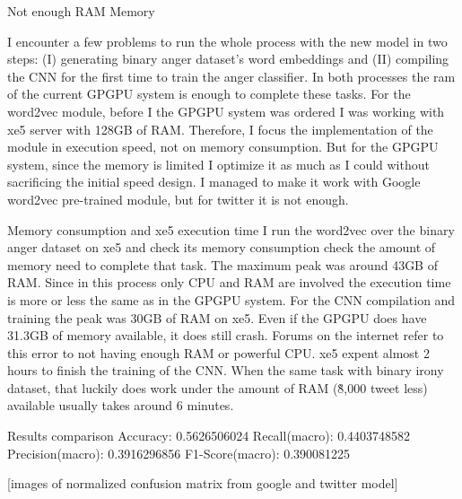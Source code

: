 Not enough RAM Memory

I encounter a few problems to run the whole process with the new model in two steps: (I) generating binary anger dataset’s word embeddings and (II) compiling the CNN for the first time to train the anger classifier. In both processes the ram of the current GPGPU system is enough to complete these tasks. 
For the word2vec module, before I the GPGPU system was ordered I was working with xe5 server with 128GB of RAM. Therefore, I focus the implementation of the module in execution speed, not on memory consumption. But for the GPGPU system, since the memory is limited I optimize it as much as I could without sacrificing the initial speed design. I managed to make it work with Google word2vec pre-trained module, but for twitter it is not enough.

Memory consumption and xe5 execution time
I run the word2vec over the binary anger dataset on xe5 and check its memory consumption check the amount of memory need to complete that task. The maximum peak was around 43GB of RAM. Since in this process only CPU and RAM are involved the execution time is more or less the same as in the GPGPU system.
For the CNN compilation and training the peak was 30GB of RAM on xe5. Even if the GPGPU does have 31.3GB of memory available, it does still crash. Forums on the internet refer to this error to not having enough RAM or powerful CPU. xe5 expent almost 2 hours to finish the training of the CNN. When the same task with binary irony dataset, that luckily does work under the amount of RAM (\~8,000 tweet less) available usually takes around 6 minutes.

Results comparison
Accuracy: 0.5626506024
Recall(macro): 0.4403748582
Precision(macro): 0.3916296856
F1-Score(macro): 0.390081225

[images of normalized confusion matrix from google and twitter model]
